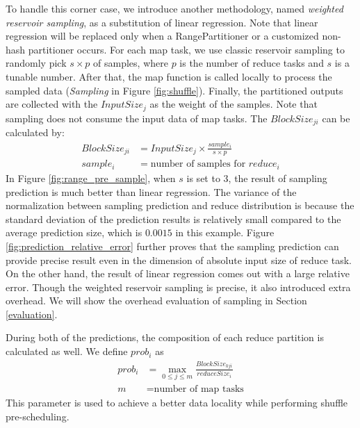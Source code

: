 To handle this corner case, we introduce another methodology, named \emph{weighted reservoir sampling}, as a substitution of linear regression. 
Note that linear regression will be replaced only when a RangePartitioner or a customized non-hash partitioner occurs. 
For each map task, we use classic reservoir sampling to randomly pick $s \times p$ of samples, where $p$ is the number of reduce tasks and $s$ is a tunable number. 
After that, the map function is called locally to process the sampled data (\textit{Sampling} in Figure \ref{fig:shuffle}). 
Finally, the partitioned outputs are collected with the $InputSize_j$ as the weight of the samples.
Note that sampling does not consume the input data of map tasks. 
The $BlockSize_{ji}$ can be calculated by:
\begin{equation}
\label{equationsample}
\begin{aligned}
	BlockSize_{ji} &= {{InputSize_j \times \frac{sample_i}{s \times p}}} \\
	sample_i &= \text{number of samples for $reduce_i$}
\end{aligned}
\end{equation}
In Figure \ref{fig:range_pre_sample}, when $s$ is set to $3$, the result of sampling prediction is much better than linear regression. 
The variance of the normalization between sampling prediction and reduce distribution is because the standard deviation of the prediction results is relatively small compared to the average prediction size, which is $0.0015$ in this example. 
Figure \ref{fig:prediction_relative_error} further proves that the sampling prediction can provide precise result even in the dimension of absolute input size of reduce task. 
On the other hand, the result of linear regression comes out with a large relative error. 
Though the weighted reservoir sampling is precise, it also introduced extra overhead. 
We will show the overhead evaluation of sampling in Section \ref{evaluation}.

During both of the predictions, the composition of each reduce partition is calculated as well. We define $prob_i$ as
\begin{equation}
\label{equationprob}
\begin{aligned}
	prob_i &= \max_{0 \leq j \leq m} \frac{BlockSize_{kji}}{reduceSize_i} \\
    m &= \text{number of map tasks}
\end{aligned}
\end{equation}
This parameter is used to achieve a better data locality while performing shuffle pre-scheduling. 


